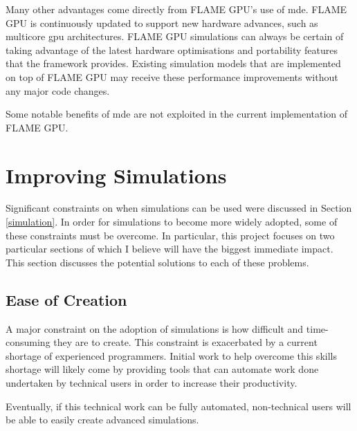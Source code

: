 \documentclass{UoYCSproject}
\begin{document}
Many other advantages come directly from \gls{FLAME GPU}'s use of \gls{mde}.
\gls{FLAME GPU} is continuously updated to support new hardware advances, such as multicore \acrshort{gpu} architectures\cite{flame_simulation}.
\gls{FLAME GPU} simulations can always be certain of taking advantage of the latest hardware optimisations and portability features that the framework provides.
Existing simulation models that are implemented on top of \gls{FLAME GPU} may receive these performance improvements without any major code changes.

Some notable benefits of \gls{mde} are not exploited in the current implementation of \gls{FLAME GPU}.

\section{Improving Simulations}
\label{improvements}
Significant constraints on when simulations can be used were discussed in Section \ref{simulation}.
In order for simulations to become more widely adopted, some of these constraints must be overcome. 
In particular, this project focuses on two particular sections of which I believe will have the biggest immediate impact.
This section discusses the potential solutions to each of these problems.

\subsection{Ease of Creation}
A major constraint on the adoption of simulations is how difficult and time-consuming they are to create.
This constraint is exacerbated by a current shortage of experienced programmers.
Initial work to help overcome this skills shortage will likely come by providing tools that can automate work done undertaken by technical users in order to increase their productivity.

Eventually, if this technical work can be fully automated, non-technical users will be able to easily create advanced simulations.
\end{document}
